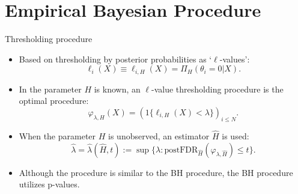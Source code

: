 \documentclass[10pt, aspectratio=169]{beamer}
\begin{document}
\section[Empirical approach]{Empirical Bayesian Procedure}


\begin{frame}{Thresholding procedure}
    
    \begin{itemize}[label=\scalebox{0.5}{$\bullet$}]
        \item Based on thresholding by posterior probabilities as ‘$\ell$-values’:
        \begin{equation}
            \ell_i(X) \equiv \ell_{i,H}(X) = \Pi_H(\theta_i = 0 | X). \tag{7}
        \end{equation}
        
        \item In the parameter \( H \) is known, an $\ell$-value thresholding procedure is the optimal procedure:
        \begin{equation}
            \varphi_{\lambda,H}(X) = \left(1\{\ell_{i,H}(X) < \lambda\}\right)_{i \leq N}. \tag{8}
        \end{equation}
        
        \item When the parameter \( H \) is unobserved, an estimator \( \hat{H} \) is used:
        \begin{equation}
             \hat{\lambda} = \hat{\lambda}(\hat{H},t) := \sup\{\lambda : \text{postFDR}_{\hat{H}}(\varphi_{\lambda,\hat{H}}) \leq t\}. \tag{9}
        \end{equation}
    \end{itemize}
    \vspace{2em}
    \begin{itemize}[label=\scalebox{0.5}{$\blacksquare$}]
        \item Although the procedure is similar to the BH procedure, the BH procedure utilizes p-values.
    \end{itemize}
\end{frame}
\end{document}
